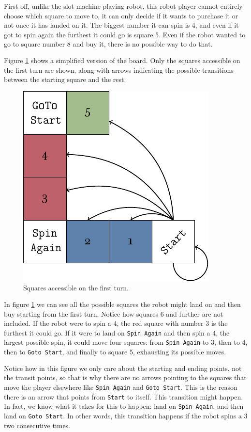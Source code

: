 First off, unlike the slot machine-playing robot, this robot 
player cannot entirely choose which square to move to, it can 
only decide if it wants to purchase it or not once it has 
landed on it. The biggest number it can spin is 4, and even if 
it got to spin again the furthest it could go is square 5. Even 
if the robot wanted to go to square number 8 and buy it, there 
is no possible way to do that.

Figure \ref{fig:miniopoly-diagram-start} shows a simplified 
version of the board. Only the squares accessible on the first 
turn are shown, along with arrows indicating the possible 
transitions between the starting square and the rest.
\begin{figure}[h]
	\centering
	\includegraphics[width=.65\textwidth]{img/diagram-start.pdf}
	\caption{Squares accessible on the first turn.}
	\label{fig:miniopoly-diagram-start}
\end{figure}

In figure \ref{fig:miniopoly-diagram-start} we can see all the 
possible squares the robot might land on and then buy starting 
from the first turn. Notice how squares 6 and further are not 
included. If the robot were to spin a 4, the red square with 
number 3 is the furthest it could go. If it were to land on 
\texttt{Spin Again} and then spin a 4, the largest possible 
spin, it could move four squares: from \texttt{Spin Again} to 
3, then to 4, then to \texttt{Goto Start}, and finally to 
square 5, exhausting its possible moves.

Notice how in this figure we only care about the starting and 
ending points, not the transit points, so that is why there are 
no arrows pointing to the squares that move the player 
elsewhere like \texttt{Spin Again} and \texttt{Goto Start}. 
This is the reason there is an arrow that points from 
\texttt{Start} to itself. This transition might happen. In 
fact, we know what it takes for this to happen: land on 
\texttt{Spin Again}, and then land on \texttt{Goto Start}. In 
other words, this transition happens if the robot spins a 3 two 
consecutive times.

